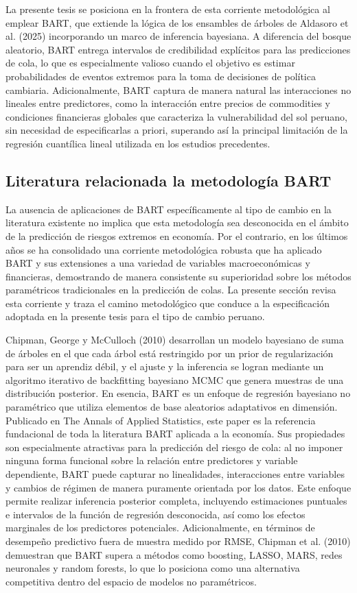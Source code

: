 ﻿\documentclass[11pt,a4paper]{article}
\begin{document}
La presente tesis se posiciona en la frontera de esta corriente metodológica al emplear BART, que extiende la lógica de los ensambles de árboles de Aldasoro et al. (2025) incorporando un marco de inferencia bayesiana. A diferencia del bosque aleatorio, BART entrega intervalos de credibilidad explícitos para las predicciones de cola, lo que es especialmente valioso cuando el objetivo es estimar probabilidades de eventos extremos para la toma de decisiones de política cambiaria. Adicionalmente, BART captura de manera natural las interacciones no lineales entre predictores, como la interacción entre precios de commodities y condiciones financieras globales que caracteriza la vulnerabilidad del sol peruano, sin necesidad de especificarlas a priori, superando así la principal limitación de la regresión cuantílica lineal utilizada en los estudios precedentes.

\subsection{Literatura relacionada la metodología BART}

La ausencia de aplicaciones de BART específicamente al tipo de cambio en la literatura existente no implica que esta metodología sea desconocida en el ámbito de la predicción de riesgos extremos en economía. Por el contrario, en los últimos años se ha consolidado una corriente metodológica robusta que ha aplicado BART y sus extensiones a una variedad de variables macroeconómicas y financieras, demostrando de manera consistente su superioridad sobre los métodos paramétricos tradicionales en la predicción de colas. La presente sección revisa esta corriente y traza el camino metodológico que conduce a la especificación adoptada en la presente tesis para el tipo de cambio peruano.


Chipman, George y McCulloch (2010) desarrollan un modelo bayesiano de suma de árboles en el que cada árbol está restringido por un prior de regularización para ser un aprendiz débil, y el ajuste y la inferencia se logran mediante un algoritmo iterativo de backfitting bayesiano MCMC que genera muestras de una distribución posterior. En esencia, BART es un enfoque de regresión bayesiano no paramétrico que utiliza elementos de base aleatorios adaptativos en dimensión. Publicado en The Annals of Applied Statistics, este paper es la referencia fundacional de toda la literatura BART aplicada a la economía. Sus propiedades son especialmente atractivas para la predicción del riesgo de cola: al no imponer ninguna forma funcional sobre la relación entre predictores y variable dependiente, BART puede capturar no linealidades, interacciones entre variables y cambios de régimen de manera puramente orientada por los datos. Este enfoque permite realizar inferencia posterior completa, incluyendo estimaciones puntuales e intervalos de la función de regresión desconocida, así como los efectos marginales de los predictores potenciales. Adicionalmente, en términos de desempeño predictivo fuera de muestra medido por RMSE, Chipman et al. (2010) demuestran que BART supera a métodos como boosting, LASSO, MARS, redes neuronales y random forests, lo que lo posiciona como una alternativa competitiva dentro del espacio de modelos no paramétricos.
\end{document}
